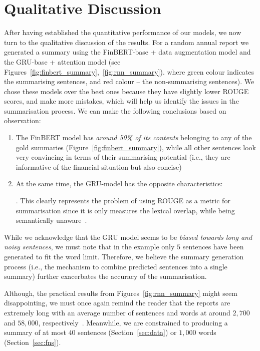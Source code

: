 \section{Qualitative Discussion}\label{sec:qualitative-discussion}
After having established the quantitative performance of our models, we now turn to the qualitative discussion of the results.
For a random annual report we generated a summary using the FinBERT-base + data augmentation model and
the GRU-base + attention model (see Figures~\ref{fig:finbert_summary},~\ref{fig:rnn_summary}).
where green colour indicates the summarising sentences, and red colour -- the non-summarising sentences).
We chose these models over the best ones because they have slightly lower ROUGE scores, and make more mistakes, which will help us identify the issues in the summarisation process.
We can make the following conclusions based on observation:
\begin{enumerate}
    \item The FinBERT model has \emph{around 50\% of its contents} belonging to any of the gold summaries (Figure~\ref{fig:finbert_summary}),
        while all other sentences look very convincing in terms of their summarising potential (i.e., they are informative of the financial situation but also concise)
    \item At the same time, the GRU-model has the opposite characteristics:
    .
    This clearly represents the problem of using ROUGE as a metric for summarisation since it is only measures the lexical overlap, while being semantically unaware~\cite{akter-etal-2022-revisiting}.
\end{enumerate}
While we acknowledge that the GRU model seems to be \emph{biased towards long and noisy sentences}, we must note that in the example
only $5$ sentences have been generated to fit the word limit.
Therefore, we believe the summary generation process (i.e., the mechanism to combine predicted sentences into a single summary) further
exacerbates the accuracy of the summarisation.

Although, the practical results from Figures~\ref{fig:rnn_summary} might seem disappointing, we must once again remind the reader that the reports are extremely
long with an average number of sentences and words at around $2,700$ and $58,000$, respectively~\cite{litvak-vanetik-2021-summarization}.
Meanwhile, we are constrained to producing a summary of at most $40$ sentences (Section~\ref{sec:data}) or $1,000$ words (Section~\ref{sec:fns}).

